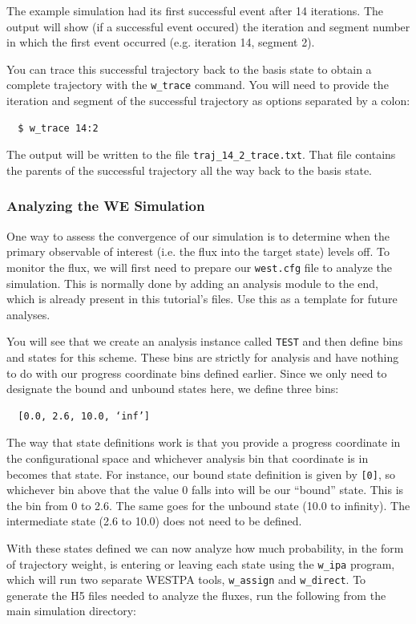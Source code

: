 The example simulation had its first successful event after 14 iterations. 
The output will show (if a successful event occured) the iteration and segment number in which the first event occurred (e.g. iteration 14, segment 2).

You can trace this successful trajectory back to the basis state to obtain a complete trajectory with the \verb|w_trace| command. 
You will need to provide the iteration and segment of the successful trajectory as options separated by a colon:
\begin{verbatim}
  $ w_trace 14:2
\end{verbatim} 
The output will be written to the file \verb|traj_14_2_trace.txt|. 
That file contains the parents of the successful trajectory all the way back to the basis state. 

\subsubsection{Analyzing the WE Simulation}
\label{tut:basic-nacl-plot}
One way to assess the convergence of our simulation is to determine when the primary observable of interest (i.e. the flux into the target state) levels off. 
To monitor the flux, we will first need to prepare our \verb|west.cfg| file to analyze the simulation. 
This is normally done by adding an analysis module to the end, which is already present in this tutorial’s files. 
Use this as a template for future analyses.

You will see that we create an analysis instance called \verb|TEST| and then define bins and states for this scheme. 
These bins are strictly for analysis and have nothing to do with our progress coordinate bins defined earlier. 
Since we only need to designate the bound and unbound states here, we define three bins: 
\begin{verbatim}
  [0.0, 2.6, 10.0, ‘inf’]
\end{verbatim}
 
The way that state definitions work is that you provide a progress coordinate in the configurational space and whichever analysis bin that coordinate is in becomes that state. 
For instance, our bound state definition is given by \verb|[0]|, so whichever bin above that the value 0 falls into will be our “bound” state. 
This is the bin from 0 to 2.6. 
The same goes for the unbound state (10.0 to infinity). 
The intermediate state (2.6 to 10.0) does not need to be defined.

With these states defined we can now analyze how much probability, in the form of trajectory weight, is entering or leaving each state using the \verb|w_ipa| program, which will run two separate WESTPA tools, \verb|w_assign| and \verb|w_direct|. 
To generate the H5 files needed to analyze the fluxes, run the following from the main simulation directory:

